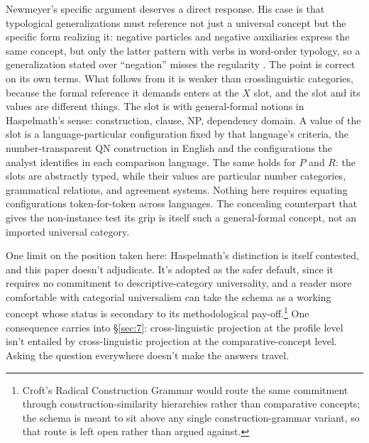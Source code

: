 Newmeyer's specific argument deserves a direct response. His case is that typological generalizations must reference not just a universal concept but the specific form realizing it: negative particles and negative auxiliaries express the same concept, but only the latter pattern with verbs in word-order typology, so a generalization stated over \enquote{negation} misses the regularity \autocite[136]{newmeyer-2007-crosslinguistic-formal-categories}. The point is correct on its own terms. What follows from it is weaker than crosslinguistic  categories, because the formal reference it demands enters at the $X$ slot, and the slot and its values are different things. The slot is  with general-formal notions in Haspelmath's \autocite*[666]{haspelmath-2010-comparative-concepts} sense: construction, clause, NP, dependency domain. A value of the slot is a language-particular configuration fixed by that language's criteria, the number-transparent QN construction in English and the configurations the analyst identifies in each comparison language. The same holds for $P$ and $R$: the slots are abstractly typed, while their values are particular number categories, grammatical relations, and agreement systems. Nothing here requires equating configurations token-for-token across languages. The concealing counterpart that gives the non-instance test its grip is itself such a general-formal concept, not an imported universal category.

One limit on the position taken here: Haspelmath's distinction is itself contested, and this paper doesn't adjudicate. It's adopted as the safer default, since it requires no commitment to descriptive-category universality, and a reader more comfortable with categorial universalism can take the schema as a working concept whose status is secondary to its methodological pay-off.\footnote{Croft's \autocite*{croft-2001-radical-construction-grammar} Radical Construction Grammar would route the same commitment through construction-similarity hierarchies rather than comparative concepts; the schema is meant to sit above any single construction-grammar variant, so that route is left open rather than argued against.} One consequence carries into §\ref{sec:7}: cross-linguistic projection at the profile level isn't entailed by cross-linguistic projection at the comparative-concept level. Asking the question everywhere doesn't make the answers travel.
